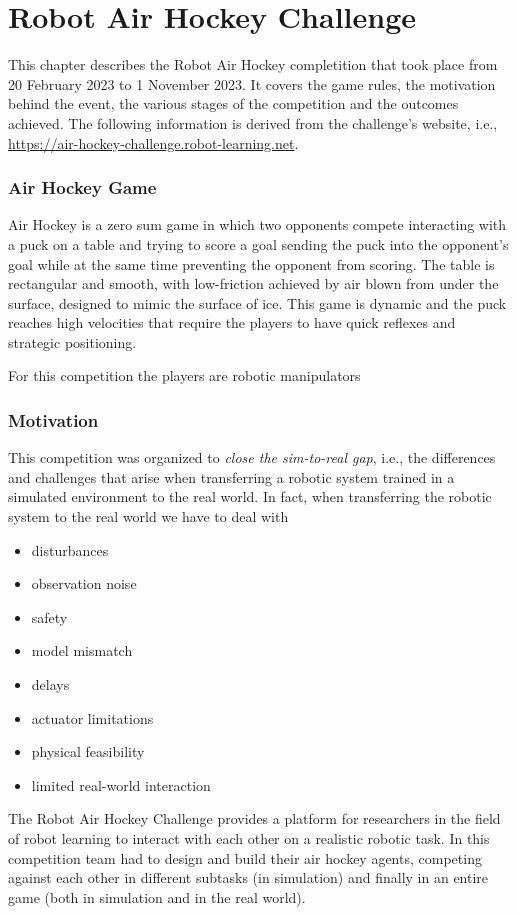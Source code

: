 \chapter{Robot Air Hockey Challenge}
\label{ch:robot_air_hockey_challenge}
This chapter describes the Robot Air Hockey completition that took place from 20 February 2023 to 1 November 2023.
It covers the game rules, the motivation behind the event, the various stages of the competition and the outcomes achieved.
The following information is derived from the challenge's website, i.e., \url{https://air-hockey-challenge.robot-learning.net}.

\subsection{Air Hockey Game}
Air Hockey is a zero sum game in which two opponents compete interacting with a puck on a table and trying to score a goal
sending the puck into the opponent's goal while at the same time preventing the opponent from scoring.
The table is rectangular and smooth, with low-friction achieved by air blown from under the surface, designed to mimic the surface of ice.
This game is dynamic and the puck reaches high velocities that require the players to have quick reflexes and strategic positioning.

For this competition the players are robotic manipulators

\subsection{Motivation}
This competition was organized to \textit{close the sim-to-real gap}, i.e., the differences and challenges that arise
when transferring a robotic system trained in a simulated environment to the real world.
In fact, when transferring the robotic system to the real world we have to deal with
\begin{itemize}
    \item disturbances
    \item observation noise
    \item safety
    \item model mismatch
    \item delays
    \item actuator limitations
    \item physical feasibility
    \item limited real-world interaction
\end{itemize}

The Robot Air Hockey Challenge provides a platform for researchers in the field of robot learning to interact with each
other on a realistic robotic task. In this competition team had to design and build their air hockey agents, competing against
each other in different subtasks (in simulation) and finally in an entire game (both in simulation and in the real world).



